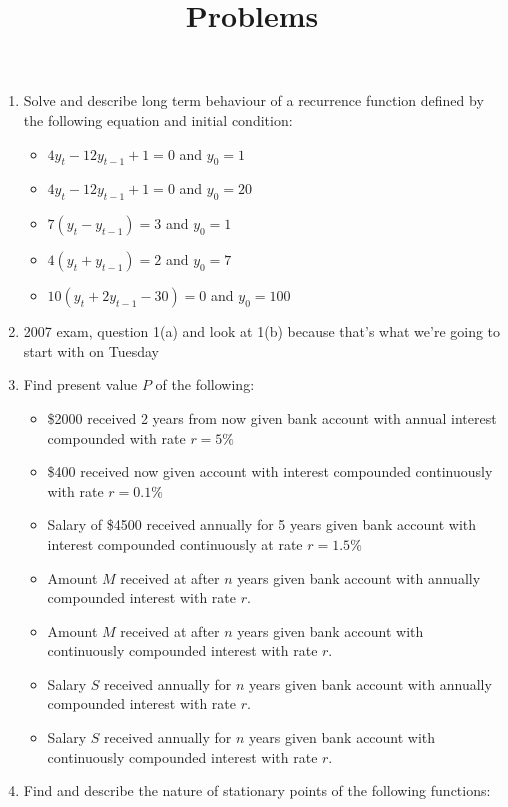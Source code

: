 \documentclass[11pt,a4paper]{article}
\theoremstyle{break}
\theoremstyle{break}
\begin{document}
\title{Problems}
\date{}
\maketitle


\begin{enumerate}
\item Solve and describe long term behaviour of a recurrence function defined by the following equation and initial condition:
\begin{itemize}
	\item $4y_{t} - 12y_{t-1} + 1 = 0$ and $y_{0} = 1$
	\item $4y_{t} - 12y_{t-1} + 1 = 0$ and $y_{0} = 20$
	\item $7(y_{t} - y_{t-1}) = 3$ and $y_{0} = 1$
	\item $4(y_{t} + y_{t-1}) = 2$ and $y_{0} = 7$
	\item $10(y_{t} + 2y_{t-1} - 30) = 0$ and $y_{0} = 100$
\end{itemize}
\item 2007 exam, question 1(a) and look at 1(b) because that's what we're going to start with on Tuesday
\item Find present value $P$ of the following:
\begin{itemize}
	\item \$2000 received 2 years from now given bank account with annual interest compounded with rate $r = 5\%$ 
	\item \$400 received now given account with interest compounded continuously with rate $r = 0.1\%$
	\item Salary of \$4500 received annually for 5 years given bank account with interest compounded continuously at rate $r = 1.5\% $
	\item Amount $M$ received at after $n$ years given bank account with annually compounded interest with rate $r$.
	\item Amount $M$ received at after $n$ years given bank account with continuously compounded interest with rate $r$.
	\item Salary $S$ received annually for $n$ years given bank account with annually compounded interest with rate $r$.
	\item Salary $S$ received annually for $n$ years given bank account with continuously compounded interest with rate $r$.
\end{itemize}
\item Find and describe the nature of stationary points of the following functions:
\begin{itemize}

\end{itemize}
\end{enumerate}
\end{document}
